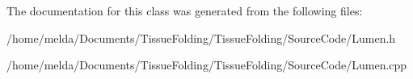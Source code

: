 The documentation for this class was generated from the following files\+:\begin{DoxyCompactItemize}
\item 
/home/melda/\+Documents/\+Tissue\+Folding/\+Tissue\+Folding/\+Source\+Code/Lumen.\+h\item 
/home/melda/\+Documents/\+Tissue\+Folding/\+Tissue\+Folding/\+Source\+Code/Lumen.\+cpp\end{DoxyCompactItemize}
